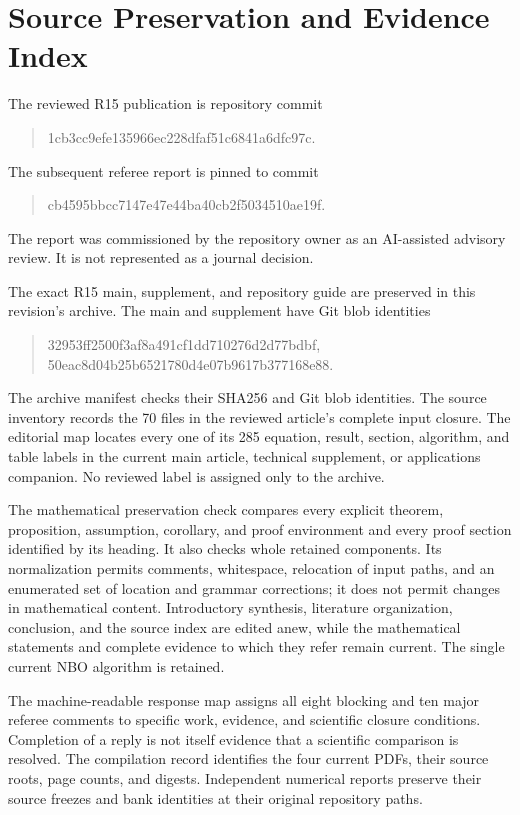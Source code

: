 \section{Source Preservation and Evidence Index}\label{app:r15index}
The reviewed R15 publication is repository commit
\begin{quote}\small\ttfamily
1cb3cc9e\allowbreak fe135966\allowbreak ec228dfa\allowbreak f51c6841\allowbreak a6dfc97c.
\end{quote}
The subsequent referee report is pinned to commit
\begin{quote}\small\ttfamily
cb4595bb\allowbreak cc7147e4\allowbreak 7e44ba40\allowbreak cb2f5034\allowbreak 510ae19f.
\end{quote}
The report was commissioned by the repository owner as an AI-assisted advisory review. It is not represented as a journal decision.

The exact R15 main, supplement, and repository guide are preserved in this revision's archive. The main and supplement have Git blob identities
\begin{quote}\small\ttfamily
32953ff2\allowbreak 500f3af8\allowbreak a491cf1d\allowbreak d710276d\allowbreak 2d77bdbf,\\
50eac8d0\allowbreak 4b25b652\allowbreak 1780d4e0\allowbreak 7b9617b3\allowbreak 77168e88.
\end{quote}
The archive manifest checks their SHA256 and Git blob identities. The source inventory records the 70 files in the reviewed article's complete input closure. The editorial map locates every one of its 285 equation, result, section, algorithm, and table labels in the current main article, technical supplement, or applications companion. No reviewed label is assigned only to the archive.

The mathematical preservation check compares every explicit theorem, proposition, assumption, corollary, and proof environment and every proof section identified by its heading. It also checks whole retained components. Its normalization permits comments, whitespace, relocation of input paths, and an enumerated set of location and grammar corrections; it does not permit changes in mathematical content. Introductory synthesis, literature organization, conclusion, and the source index are edited anew, while the mathematical statements and complete evidence to which they refer remain current. The single current NBO algorithm is retained.

The machine-readable response map assigns all eight blocking and ten major referee comments to specific work, evidence, and scientific closure conditions. Completion of a reply is not itself evidence that a scientific comparison is resolved. The compilation record identifies the four current PDFs, their source roots, page counts, and digests. Independent numerical reports preserve their source freezes and bank identities at their original repository paths.
